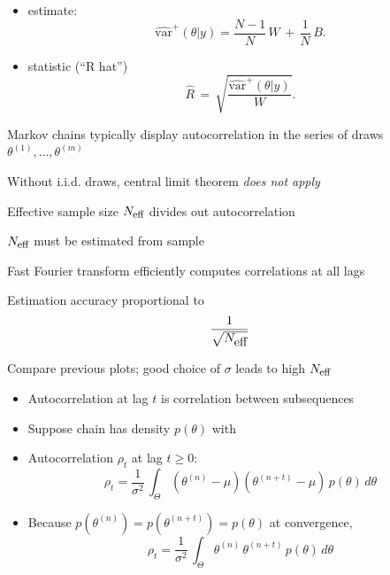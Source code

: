 \documentclass[10pt]{report}
\begin{document}
%
\begin{itemize}
\item {} estimate:
\[\textstyle
\widehat{\mbox{var}}^{+}\!(\theta|y)
= \frac{N-1}{N}\, W \, + \, \frac{1}{N} \, B.
\]
%
\vspace*{6pt}
\item {} statistic (``R hat'')
\[\textstyle
\hat{R}
\, = \,
\sqrt{\frac{\widehat{\mbox{var}}^{+}\!(\theta|y)}{W}}.
\]
\end{itemize}


%
\begin{subitemize}
\item Markov chains typically display autocorrelation in the series of
  draws $\theta^{(1)}, \ldots, \theta^{(m)}$
\item Without i.i.d. draws, central limit theorem \emph{does not apply}
\item Effective sample size $N_{\mbox{\footnotesize eff}}$ divides out
  autocorrelation
\item $N_{\mbox{\footnotesize eff}}$ must be estimated from sample
\begin{subsubitemize}
\item Fast Fourier transform efficiently computes correlations at all lags
\end{subsubitemize}
\vspace*{-6pt}
\item Estimation accuracy proportional to
{\large
\[
\frac{1}{\sqrt{N_{\mbox{\normalsize eff}}}}
\]
}
\item Compare previous plots; good choice of $\sigma$ leads to high
$N_{\mbox{\footnotesize eff}}$
\end{subitemize}


%
\begin{itemize}
\item Autocorrelation at lag $t$ is correlation between subsequences
\item  Suppose chain has density $p(\theta)$ with
\item Autocorrelation $\rho_t$ at lag $t \geq 0$:
\[
\rho_t  =  \frac{1}{\sigma^2} \, \int_{\Theta} (\theta^{(n)} - \mu)
       (\theta^{(n+t)} - \mu) \, p(\theta) \, d\theta
\]
\item Because $p(\theta^{(n)}) = p(\theta^{(n+t)}) = p(\theta)$ at convergence,
\[
\rho_t = \frac{1}{\sigma^2} \, \int_{\Theta} \theta^{(n)} \, \theta^{(n+t)} \, p(\theta) \, d\theta
\]
\end{itemize}
\end{document}
